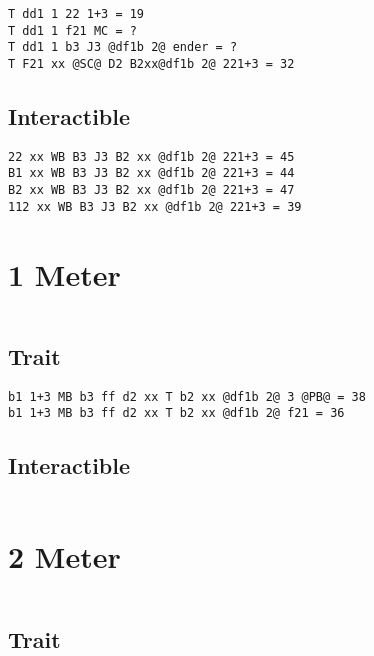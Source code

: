 \documentclass[main.tex]{subfiles}
\begin{document}
\begin{lstlisting}[language=FG]
T dd1 1 22 1+3 = 19
T dd1 1 f21 MC = ?
T dd1 1 b3 J3 @df1b 2@ ender = ?
T F21 xx @SC@ D2 B2xx@df1b 2@ 221+3 = 32
\end{lstlisting}


\subsection{Interactible}
\begin{lstlisting}[language=FG]
22 xx WB B3 J3 B2 xx @df1b 2@ 221+3 = 45
B1 xx WB B3 J3 B2 xx @df1b 2@ 221+3 = 44
B2 xx WB B3 J3 B2 xx @df1b 2@ 221+3 = 47
112 xx WB B3 J3 B2 xx @df1b 2@ 221+3 = 39
\end{lstlisting}

\section{1 Meter}


\begin{lstlisting}[language=FG]
\end{lstlisting}

\subsection{Trait}
\begin{lstlisting}[language=FG]
b1 1+3 MB b3 ff d2 xx T b2 xx @df1b 2@ 3 @PB@ = 38
b1 1+3 MB b3 ff d2 xx T b2 xx @df1b 2@ f21 = 36 
\end{lstlisting}


\subsection{Interactible}
\begin{lstlisting}[language=FG]

\end{lstlisting}

\section{2 Meter}


\begin{lstlisting}[language=FG]
\end{lstlisting}

\subsection{Trait}
\end{document}
